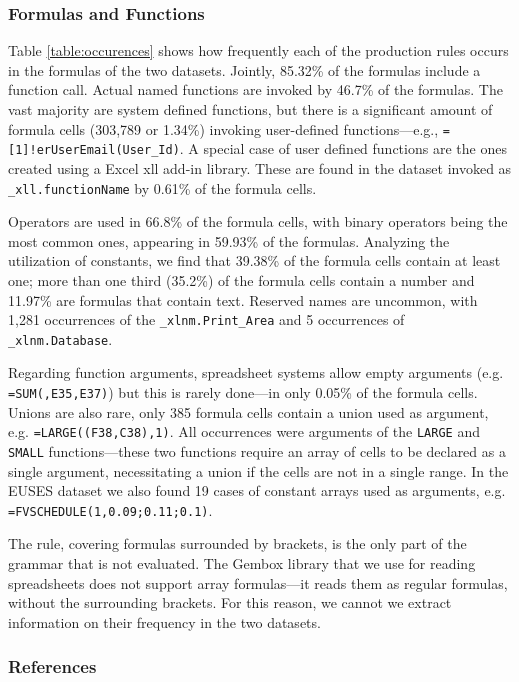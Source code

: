 \documentclass[conference]{IEEEtran}
\begin{document}
\subsubsection{Formulas and Functions}

Table \ref{table:occurences} shows how frequently each of the production rules occurs in the formulas of the two datasets. Jointly, 85.32\% of the formulas include a function call. Actual named functions are invoked by 46.7\% of the formulas. The vast majority are system defined functions, but there is a significant amount of formula cells (303,789 or 1.34\%) invoking user-defined functions---e.g., \texttt{=[1]!erUserEmail(User_Id)}. A special case of user defined functions are the ones created using a Excel xll add-in library. These are found in the dataset invoked as \texttt{_xll.functionName} by 0.61\% of the formula cells.

Operators are used in 66.8\% of the formula cells, with binary operators being the most common ones, appearing in 59.93\% of the formulas. Analyzing the utilization of constants, we find that 39.38\% of the formula cells contain at least one; more than one third (35.2\%) of the formula cells contain a number and 11.97\% are formulas that contain text. Reserved names are uncommon, with 1,281 occurrences of the \texttt{_xlnm.Print_Area} and 5 occurrences of \texttt{_xlnm.Database}.

Regarding function arguments, spreadsheet systems allow empty arguments (e.g. \texttt{=SUM(,E35,E37)}) but this is rarely done---in only 0.05\% of the formula cells. Unions are also rare, only 385 formula cells contain a union used as argument, e.g. \texttt{=LARGE((F38,C38),1)}. All occurrences were arguments of the \texttt{LARGE} and \texttt{SMALL} functions---these two functions require an array of cells to be declared as a single argument, necessitating a union if the cells are not in a single range. In the EUSES dataset we also found 19 cases of constant arrays used as arguments, e.g. \texttt{=FVSCHEDULE(1,{0.09;0.11;0.1})}.

The  rule, covering formulas surrounded by brackets, is the only part of the grammar that is not evaluated. The Gembox library that we use for reading spreadsheets does not support array formulas---it reads them as regular formulas, without the surrounding brackets. For this reason, we cannot we extract information on their frequency in the two datasets.

\subsubsection{References}
\end{document}
